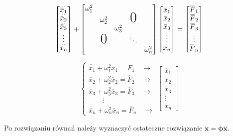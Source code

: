 \begin{gather}
	\begin{bmatrix} 
		\ddot{\overbar{x}_1} \\
		\ddot{\overbar{x}_2} \\
		\ddot{\overbar{x}_3} \\
		\vdots \\
		\ddot{\overbar{x}_n}
	\end{bmatrix} +
	\begin{bmatrix} 
		\omega_1^2	&			&			&				& \\
				& \omega_2^2	& 			& \text{\huge{0}}		& \\
				&			& \omega_3^2 	& 				& \\
				& \text{\huge{0}}	& 			& \ddots			& \\
				&			&			&				& \omega_n^2
	\end{bmatrix}
	\begin{bmatrix} 
		\overbar{x}_1 \\
		\overbar{x}_2 \\
		\overbar{x}_3 \\
		\vdots \\
		\overbar{x}_n
	\end{bmatrix} =
	\begin{bmatrix} 
		\overbar{F}_1 \\
		\overbar{F}_2 \\
		\overbar{F}_3 \\
		\vdots \\
		\overbar{F}_n
	\end{bmatrix}
\end{gather}

 \begin{equation}
	\left\{
                \begin{array}{ll}
  		\ddot{\overbar{x}_1}+\omega_1^2\overbar{x}_1=\overbar{F}_1 \quad \rightarrow\\
  		\ddot{\overbar{x}_2}+\omega_2^2\overbar{x}_2=\overbar{F}_2 \quad \rightarrow\\
  		\ddot{\overbar{x}_3}+\omega_3^2\overbar{x}_3=\overbar{F}_3 \quad \rightarrow\\
		\quad \quad \vdots \quad \quad \\
  		\ddot{\overbar{x}_n}+\omega_n^2\overbar{x}_n=\overbar{F}_n \quad \rightarrow
                \end{array}
	\begin{bmatrix} 
		\overbar{x}_1 \\
		\overbar{x}_2 \\
		\overbar{x}_3 \\
		\vdots \\
		\overbar{x}_n
	\end{bmatrix}
	\right.
 \end{equation}

Po rozwiązaniu równań należy wyznaczyć ostateczne rozwiązanie \( \textbf{x} = \boldsymbol{\phi} \overbar{\textbf{x}}  \).

















